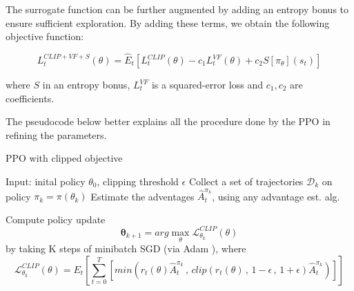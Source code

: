 The surrogate function can be further augmented by adding an entropy bonus to ensure sufficient exploration. By adding these terms, we obtain the following objective function:

\begin{equation}
L_t^{CLIP+VF+S}(\theta) = \hat E_t \left[ L_t^{CLIP}(\theta) - c_1 L_t^{VF}(\theta)  + c_2 S[\pi_\theta](s_t)\right]
\end{equation}

where \( S \) in an entropy bonus, \(  L_t^{VF} \) is a squared-error loss and \(c_1, c_2 \) are coefficients.

The pseudocode below better explains all the procedure done by the PPO in refining the parameters.

\begin{algorithm}
  \caption{PPO with clipped objective}\label{alg:ppo_clip}
  \begin{algorithmic}
    \State Input: inital policy \( \theta_0 \), clipping threshold \( \epsilon \)
      \State Collect a set of trajectories $\mathcal{D}_k$ on policy \( \pi_k = \pi(\theta_k) \)
      \State Estimate the adventages \( \hat A_t^{\pi_k} \), using any advantage est. alg. 
      
      \State Compute policy update
      \begin{equation*}
        \mathbf{\theta}_{k+1} = arg \max_\theta \mathcal{L}^{CLIP}_{\theta_k}(\theta)
      \end{equation*}
      \State by taking K steps of minibatch SGD (via Adam \cite{kingma2014adam}), where
      \begin{equation*}
        \mathcal{L}^{CLIP}_{\theta_k}(\theta) =  E_t \left[ \sum_{t=0}^T\left[  min(r_t(\theta)\hat A^{\pi_k}_t \,, \, clip(r_t(\theta) \,,\, 1-\epsilon\,,\, 1+ \epsilon)\hat A_t^{\pi_k})\right]\right]
      \end{equation*}
    \EndFor
  \end{algorithmic}
\end{algorithm}



